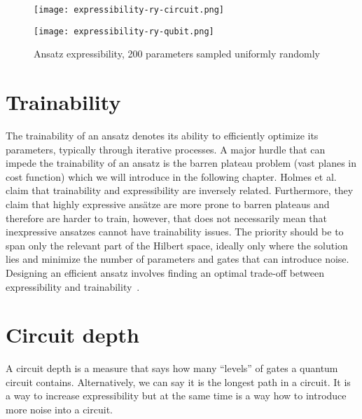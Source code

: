 \begin{figure}[H]
    \centering
    \begin{minipage}{0.4\linewidth}
        \centering
        \texttt{[image: expressibility-ry-circuit.png]}
    \end{minipage}
    \begin{minipage}{0.4\linewidth}
        \centering
        \texttt{[image: expressibility-ry-qubit.png]}
    \end{minipage}
    \caption{Ansatz expressibility, 200 parameters sampled uniformly randomly}
\end{figure}

\section{Trainability}
The trainability of an ansatz denotes its ability to efficiently optimize its parameters, typically through iterative processes. A major hurdle that can impede the trainability of an ansatz is the barren plateau problem (vast planes in cost function) which we will introduce in the following chapter. Holmes et al.~\cite{holmes2022} claim that trainability and expressibility are inversely related. Furthermore, they claim that highly expressive ansätze are more prone to barren plateaus and therefore are harder to train, however, that does not necessarily mean that inexpressive ansatzes cannot have trainability issues. The priority should be to span only the relevant part of the Hilbert space, ideally only where the solution lies and minimize the number of parameters and gates that can introduce noise. Designing an efficient ansatz involves finding an optimal trade-off between expressibility and trainability~\cite{holmes2022}.


\section{Circuit depth}
A circuit depth is a measure that says how many ``levels'' of gates a quantum circuit contains. Alternatively, we can say it is the longest path in a circuit. It is a way to increase expressibility but at the same time is a way how to introduce more noise into a circuit.

